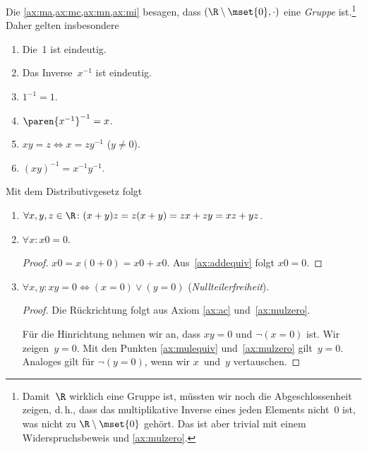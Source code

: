 \documentclass[a4paper]{article}
\begin{document}
Die \cref{ax:ma,ax:mc,ax:mn,ax:mi} besagen, dass $(\R \setminus \mset{0}, \cdot)$ eine \emph{Gruppe} ist.\footnote{Damit~$\R$ wirklich eine Gruppe ist, müssten wir noch die Abgeschlossenheit zeigen, d.\,h., dass das multiplikative Inverse eines jeden Elements nicht~0 ist, was nicht zu $\R \setminus \mset{0}$ gehört. Das ist aber trivial mit einem Widerspruchsbeweis und \cref{ax:mulzero}.} Daher gelten insbesondere
\begin{enumerate}[(a'), leftmargin=*, widest=(m)]
    \item Die~1 ist eindeutig.
    \item Das Inverse~$x^{-1}$ ist eindeutig.
    \item $1^{-1} = 1$.
    \item $\paren{x^{-1}}^{-1} = x$.
    \item $x y = z \iff x = z y^{-1}$ ($y \neq 0$).\label{ax:mulequiv}
    \item $(x y)^{-1} = x^{-1} y^{-1}$.
\end{enumerate}

Mit dem Distributivgesetz folgt
\begin{enumerate}[resume*=conclusions]
    \item $\forall x,y,z \in \R\colon (x+y)z = z(x+y) = zx + zy = xz + yz$.
    \item $\forall x\colon x0 = 0$.
          \begin{proof}
              $x0 = x(0+0) = x0 + x0$. Aus~\cref{ax:addequiv} folgt $x0 = 0$.\label{ax:mulzero}
          \end{proof}
    \item $\forall x,y\colon xy = 0 \iff (x=0) \vee (y=0)$ (\emph{Nullteilerfreiheit}).
          \begin{proof}
              Die Rückrichtung folgt aus Axiom \ref{ax:ac} und~\cref{ax:mulzero}.

              Für die Hinrichtung nehmen wir an, dass $xy = 0$ und $\neg (x = 0)$ ist. Wir zeigen~$y = 0$. Mit den Punkten \ref{ax:mulequiv} und~\ref{ax:mulzero} gilt~$y = 0$. Analoges gilt für $\neg (y = 0)$, wenn wir $x$~und~$y$ vertauschen.
          \end{proof}
\end{enumerate}
\end{document}
